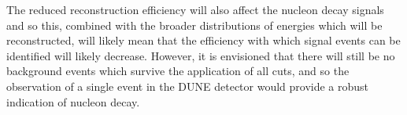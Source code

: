 The reduced reconstruction efficiency will also affect the nucleon decay signals and so this, combined with the broader distributions of energies which will be reconstructed, will likely mean that the efficiency with which signal events can be identified will likely decrease. However, it is envisioned that there will still be no background events which survive the application of all cuts, and so the observation of a single event in the DUNE detector would provide a robust indication of nucleon decay. \\
